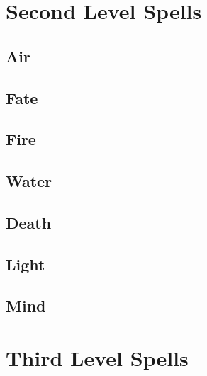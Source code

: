 \section{Second Level Spells}

\begin{multicols}{2}

\subsection{Air}



\subsection{Fate}



\subsection{Fire}



\subsection{Water}



\subsection{Death}



\subsection{Light}



\subsection{Mind}



\end{multicols}

\section{Third Level Spells}

